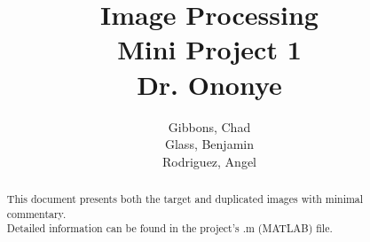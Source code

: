 \documentclass{article}
\title{Image Processing \\ Mini Project 1 \\Dr. Ononye}		%
\author{Gibbons, Chad  \\ Glass, Benjamin  \\ Rodriguez, Angel }
\begin{document}
\maketitle


\hfill 
\hfill \\
\hfill \\
\hfill \\
\hfill \\
\hfill \\
\hfill \\
\hfill \\
\hfill \\
\hfill \\
\hfill \\
\hfill \\
\hfill \\
\hfill \\
\hfill \\
\hfill \\
\hfill \\
\hfill \\
\hfill \\
\hfill \\
\hfill \\
\hfill



\begin{abstract}
\noindent
This document presents both the target and duplicated images with minimal commentary. \\ 
Detailed information can be found in the project's .m (MATLAB) file.
\end{abstract}
\end{document}
